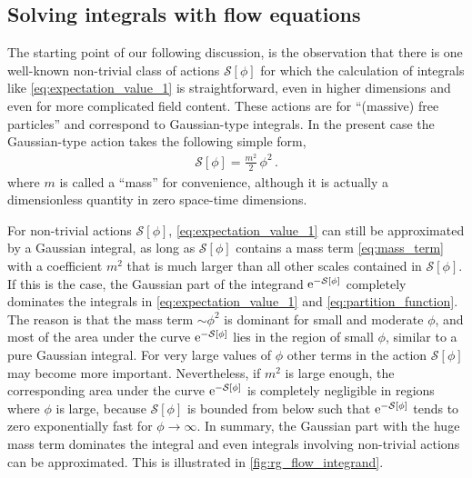 \subsection{Solving integrals with flow equations}\label{subsec:0dintegrals}
The starting point of our following discussion, is the observation that there is one well-known non-trivial class of actions $\mathcal{S}[\phi]$ for which the calculation of integrals like \cref{eq:expectation_value_1} is straightforward, even in higher dimensions and even for more complicated field content.
These actions are \qfts{} for ``(massive) free particles'' and correspond to Gaussian-type integrals.
In the present case the Gaussian-type action takes the following simple form,
\begin{align}
	\mathcal{S} [ \phi ] = \tfrac{m^2}{2} \, \phi^2 \, .	\label{eq:mass_term}
\end{align}
where $m$ is called a ``mass'' for convenience, although it is actually a dimensionless quantity in zero space-time dimensions.

For non-trivial actions $\mathcal{S}[\phi]$, \cref{eq:expectation_value_1} can still be approximated by a Gaussian integral, as long as $\mathcal{S}[\phi]$ contains a mass term \eqref{eq:mass_term} with a coefficient $m^2$ that is much larger than all other scales contained in $\mathcal{S}[\phi]$.
If this is the case, the Gaussian part of the integrand $\mathrm{e}^{-\mathcal{S}[\phi]}$ completely dominates the integrals in \cref{eq:expectation_value_1} and \eqref{eq:partition_function}.
The reason is that the mass term $\sim\phi^2$ is dominant for small and moderate $\phi$, and most of the area under the curve $\mathrm{e}^{-\mathcal{S}[\phi]}$ lies in the region of small $\phi$, similar to a pure Gaussian integral.
For very large values of $\phi$ other terms in the action $\mathcal{S}[\phi]$ may become more important.
Nevertheless, if $m^2$ is large enough, the corresponding area under the curve $\mathrm{e}^{-\mathcal{S}[\phi]}$ is completely negligible in regions where $\phi$ is large, because $\mathcal{S}[\phi]$ is bounded from below such that $\mathrm{e}^{-\mathcal{S}[\phi]}$ tends to zero exponentially fast for $\phi\to\infty$.
In summary, the Gaussian part with the huge mass term dominates the integral and even integrals involving non-trivial actions can be approximated.
This is illustrated in \cref{fig:rg_flow_integrand}.


